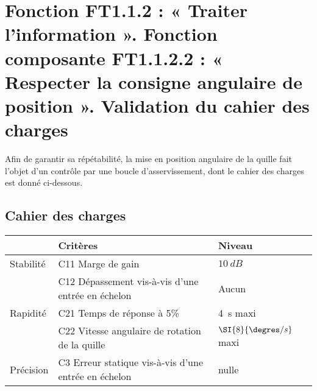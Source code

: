 %
%
%
%


\section{Fonction FT1.1.2 : « Traiter l'information ». Fonction composante FT1.1.2.2 : « Respecter la consigne angulaire de position ». Validation du cahier des charges}

Afin de garantir sa répétabilité, la mise en position angulaire de la quille fait l’objet d’un contrôle par une boucle d’asservissement, dont le cahier des charges est donné ci-dessous.

\subsection*{Cahier des charges}

\begin{center}
\begin{tabular}{lll}
\cline{2-3}
& Critères & Niveau \\
\hline
Stabilité	 & 	C11 Marge de gain 		& $\SI{10}{dB}$ \\
	 &	C12 Dépassement vis-à-vis d’une entrée en échelon 	& Aucun \\
\hline 		
Rapidité &	C21 Temps de réponse à 5\% 	& \SI{4}{s} maxi	\\
	&	C22 Vitesse angulaire de rotation de la quille	& $\SI{8}{\degres/s}$ maxi \\
\hline
Précision &	C3 Erreur statique vis-à-vis d’une entrée en échelon	& nulle \\
\hline
\end{tabular}
\end{center}

